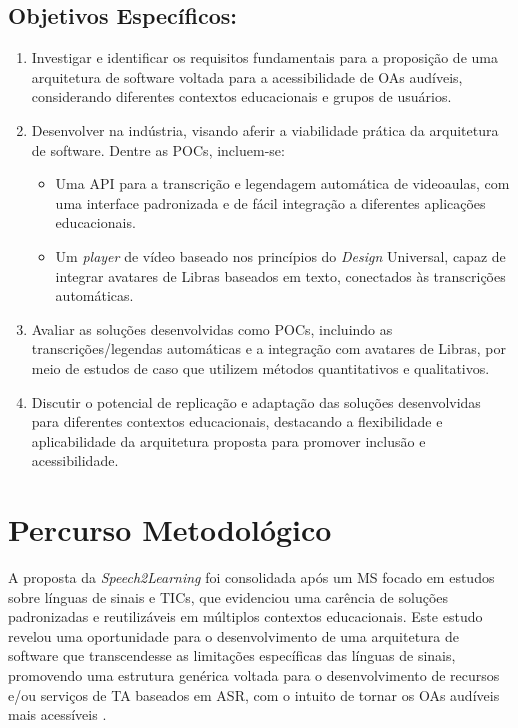 \subsection*{Objetivos Específicos:}

\begin{enumerate}
\item Investigar e identificar os requisitos fundamentais para a proposição de uma arquitetura de software voltada para a acessibilidade de OAs audíveis, considerando diferentes contextos educacionais e grupos de usuários.
\item Desenvolver  na indústria, visando aferir a viabilidade prática da arquitetura de software. Dentre as POCs, incluem-se:
\begin{itemize}
\item Uma API para a transcrição e legendagem automática de videoaulas, com uma interface padronizada e de fácil integração a diferentes aplicações educacionais.
\item Um \textit{player} de vídeo baseado nos princípios do \textit{Design} Universal, capaz de integrar avatares de Libras baseados em texto, conectados às transcrições automáticas.
\end{itemize}
\item Avaliar as soluções desenvolvidas como POCs, incluindo as transcrições/legendas automáticas e a integração com avatares de Libras, por meio de estudos de caso que utilizem métodos quantitativos e qualitativos.
\item Discutir o potencial de replicação e adaptação das soluções desenvolvidas para diferentes contextos educacionais, destacando a flexibilidade e aplicabilidade da arquitetura proposta para promover inclusão e acessibilidade.
\end{enumerate}

\section{Percurso Metodológico}

A proposta da \textit{Speech2Learning} foi consolidada após um MS focado em estudos sobre línguas de sinais e TICs, que evidenciou uma carência de soluções padronizadas e reutilizáveis em múltiplos contextos educacionais. Este estudo revelou uma oportunidade para o desenvolvimento de uma arquitetura de software que transcendesse as limitações específicas das línguas de sinais, promovendo uma estrutura genérica voltada para o desenvolvimento de recursos e/ou serviços de TA baseados em ASR, com o intuito de tornar os OAs audíveis mais acessíveis \cite{FalvoJr2020_FIE, FalvoJr2020_SBIE, FalvoJr2021_RENOTE}.

